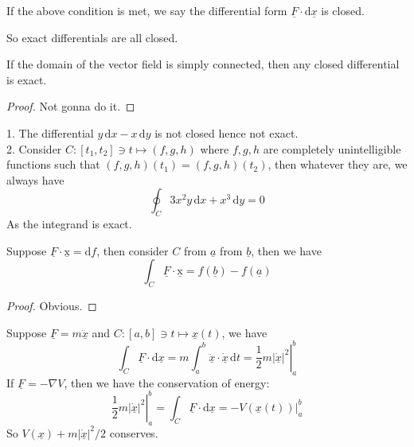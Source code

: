 \begin{definition}
    If the above condition is met, we say the differential form $\underline{F}\cdot\mathrm d\underline{x}$ is closed.
\end{definition}
So exact differentials are all closed.
\begin{theorem}
    If the domain of the vector field is simply connected, then any closed differential is exact.
\end{theorem}
\begin{proof}
    Not gonna do it.
\end{proof}
\begin{example}
    1. The differential $y\,\mathrm dx-x\,\mathrm dy$ is not closed hence not exact.\\
    2. Consider $C:[t_1,t_2]\ni t\mapsto (f,g,h)$ where $f,g,h$ are completely unintelligible functions such that $(f,g,h)(t_1)=(f,g,h)(t_2)$, then whatever they are, we always have
    $$\oint_C 3x^2y\,\mathrm dx+x^3\,\mathrm dy=0$$
    As the integrand is exact.
\end{example}
\begin{theorem}
    Suppose $\underline{F}\cdot\mathrm\underline{x}=\mathrm df$, then consider $C$ from $\underline{a}$ from $\underline{b}$, then we have
    $$\int_C\underline{F}\cdot\mathrm\underline{x}=f(\underline{b})-f(\underline{a})$$
\end{theorem}
\begin{proof}
    Obvious.
\end{proof}
\begin{example}
    Suppose $\underline{F}=m\underline{\ddot{x}}$ and $C:[a,b]\ni t\mapsto\underline{x}(t)$, we have
    $$\int_C\underline{F}\cdot\mathrm d\underline{x}=m\int_a^b\underline{\ddot{x}}\cdot\underline{\dot{x}}\,\mathrm dt=\left.\frac{1}{2}m|\underline{\dot{x}}|^2\right|_a^b$$
    If $\underline{F}=-\nabla V$, then we have the conservation of energy:
    $$\left.\frac{1}{2}m|\underline{\dot{x}}|^2\right|_a^b=\int_C\underline{F}\cdot\mathrm d\underline{x}=-\left.V(\underline{x}(t))\right|^b_a$$
    So $V(\underline{x})+m|\underline{\dot{x}}|^2/2$ conserves.
\end{example}
